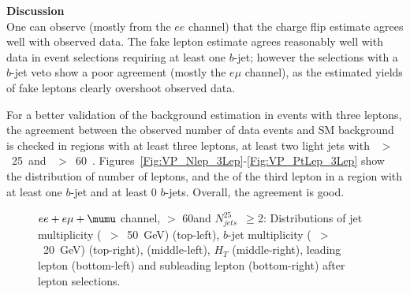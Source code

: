 \par{\bf Discussion\\}
One can observe (mostly from the $ee$ channel) that the charge flip estimate agrees well with observed data. 
The fake lepton estimate agrees reasonably well with data in event selections requiring at least one $b$-jet; 
however the selections with a $b$-jet veto show a poor agreement (mostly the $e\mu$ channel), as the estimated yields of fake leptons clearly overshoot observed data. 

For a better validation of the background estimation in events with three leptons, the agreement between the observed number of data events and SM background is checked in regions with at least three leptons, at least two light jets with \pt~$>$~25~\GeV and \met~$>$~60~\GeV. Figures~\ref{Fig:VP_Nlep_3Lep}-\ref{Fig:VP_PtLep_3Lep} show the distribution of number of leptons, and the \pt of the third lepton in a region with at least one $b$-jet and at least 0 $b$-jets. Overall, the agreement is good. 


\begin{figure}[h!]
\centering
{}
\caption{$ee+e\mu+\mumu$ channel, \met $>$ 60\GeV and $N_{jets}^{25}$~$\ge$2: Distributions of  jet multiplicity (\pt~$>$~50~GeV) (top-left), $b$-jet multiplicity (\pt~$>$~20~GeV) (top-right), \mt (middle-left), $H_T$ (middle-right), leading lepton \pt (bottom-left) and subleading lepton \pt (bottom-right) after lepton selections.}
\label{Fig:VP_allCh_bIncl_Njets_and_other}
\end{figure} 



